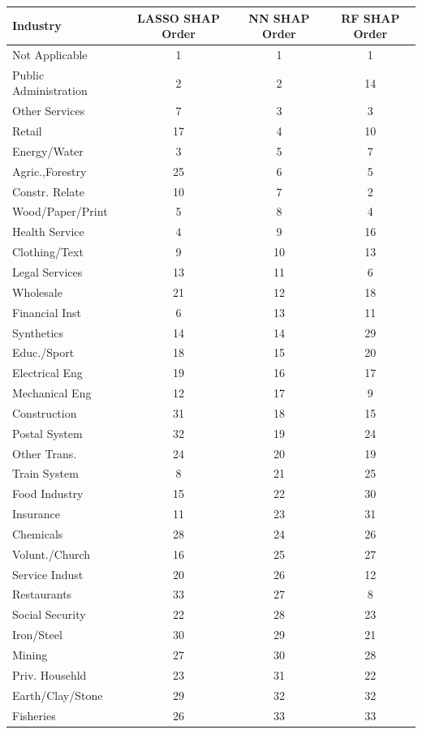 \begin{tabular}{lccc}
\hline\hline
Industry & LASSO SHAP Order & NN SHAP Order & RF SHAP Order \\
\hline
Not Applicable&1&1&1\\
Public Administration&2&2&14\\
Other Services&7&3&3\\
Retail&17&4&10\\
Energy/Water&3&5&7\\
Agric.,Forestry&25&6&5\\
Constr. Relate&10&7&2\\
Wood/Paper/Print&5&8&4\\
Health Service&4&9&16\\
Clothing/Text&9&10&13\\
Legal Services&13&11&6\\
Wholesale&21&12&18\\
Financial Inst&6&13&11\\
Synthetics&14&14&29\\
Educ./Sport&18&15&20\\
Electrical Eng&19&16&17\\
Mechanical Eng&12&17&9\\
Construction&31&18&15\\
Postal System&32&19&24\\
Other Trans.&24&20&19\\
Train System&8&21&25\\
Food Industry&15&22&30\\
Insurance&11&23&31\\
Chemicals&28&24&26\\
Volunt./Church&16&25&27\\
Service Indust&20&26&12\\
Restaurants&33&27&8\\
Social Security&22&28&23\\
Iron/Steel&30&29&21\\
Mining&27&30&28\\
Priv. Househld&23&31&22\\
Earth/Clay/Stone&29&32&32\\
Fisheries&26&33&33\\
\hline\hline
\end{tabular}
